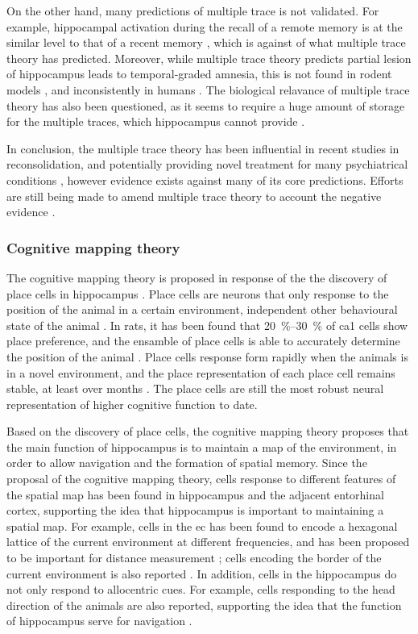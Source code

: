 On the other hand, many predictions of multiple trace is not validated. For example, hippocampal activation during the recall of a remote memory is at the similar level to that of a recent memory \citep{addis04, steinvorth06, wheeler13}, which is against of what multiple trace theory has predicted. Moreover, while multiple trace theory predicts partial lesion of hippocampus leads to temporal-graded amnesia, this is not found in rodent models \citep{sutherland10}, and inconsistently in humans \citep{yassa13}. The biological relavance of multiple trace theory has also been questioned, as it seems to require a huge amount of storage for the multiple traces, which hippocampus cannot provide . 

In conclusion, the multiple trace theory has been influential in recent studies in reconsolidation, and potentially providing novel treatment for many psychiatrical conditions \citep{dunbar16}, however evidence exists against many of its core predictions. Efforts are still being made to amend multiple trace theory to account the negative evidence \citep{moscovitch05, yassa13}.

\subsubsection{Cognitive mapping theory \label{hpc-spatial}}
The cognitive mapping theory is proposed in response of the the discovery of place cells in hippocampus \citep{o'keefe71, o'keefe78}. Place cells are neurons that only response to the position of the animal in a certain environment, independent other behavioural state of the animal \citep{o'keefe78}. In rats, it has been found that \SIrange{20}{30}{\percent} of \gls{ca1} cells show place preference, and the ensamble of place cells is able to accurately determine the position of the animal \citep{guzowski99, o'keefe05, ziv13}. Place cells response form rapidly when the animals is in a novel environment, and the place representation of each place cell remains stable, at least over months \citep{wilson93, ziv13}. The place cells are still the most robust neural representation of higher cognitive function to date.

Based on the discovery of place cells, the cognitive mapping theory proposes that the main function of hippocampus is to maintain a map of the environment, in order to allow navigation and the formation of spatial memory. Since the proposal of the cognitive mapping theory, cells response to different features of the spatial map has been found in hippocampus and the adjacent entorhinal cortex, supporting the idea that hippocampus is important to maintaining a spatial map. For example, cells in the \gls{ec} has been found to encode a hexagonal lattice of the current environment at different frequencies, and has been proposed to be important for distance measurement \citep{fyhn04, hafting05, moser15}; cells encoding the border of the current environment is also reported \citep{solstad08}. In addition, cells in the hippocampus do not only respond to allocentric cues. For example, cells responding to the head direction of the animals are also reported, supporting the idea that the function of hippocampus serve for navigation \citep{sargolini06}. 

